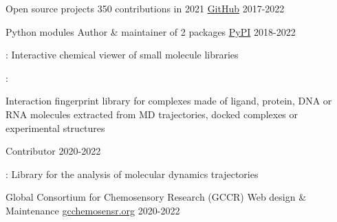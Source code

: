 
\begin{cventries}

  \cventry
    {Open source projects}
    {350 contributions in 2021}
    {\href{https://github.com/cbouy/}{GitHub}}
    {2017-2022}
    {}

  \cventry
    {Python modules}
    {Author \& maintainer of 2 packages}
    {\href{https://pypi.org/user/cbouy/}{PyPI}}
    {2018-2022}
    {
      \begin{cvitems}
        \item{: Interactive chemical viewer of small molecule libraries}
        \item{: \parbox[t]{.7\textwidth}{Interaction fingerprint library for complexes made of ligand, protein, DNA or RNA molecules extracted from MD trajectories, docked complexes or experimental structures}}
      \end{cvitems}
    }
  
  \vspace{.3em}
  \cventry
    {}
    {Contributor}
    {}
    {2020-2022}
    {
      \begin{cvitems}
        \item{: Library for the analysis of molecular dynamics trajectories}
      \end{cvitems}
    }

  \cventry
    {Global Consortium for Chemosensory Research (GCCR)}
    {Web design \& Maintenance}
    {\href{https://gcchemosensr.org/}{gcchemosensr.org}}
    {2020-2022}
    {}

\end{cventries}
